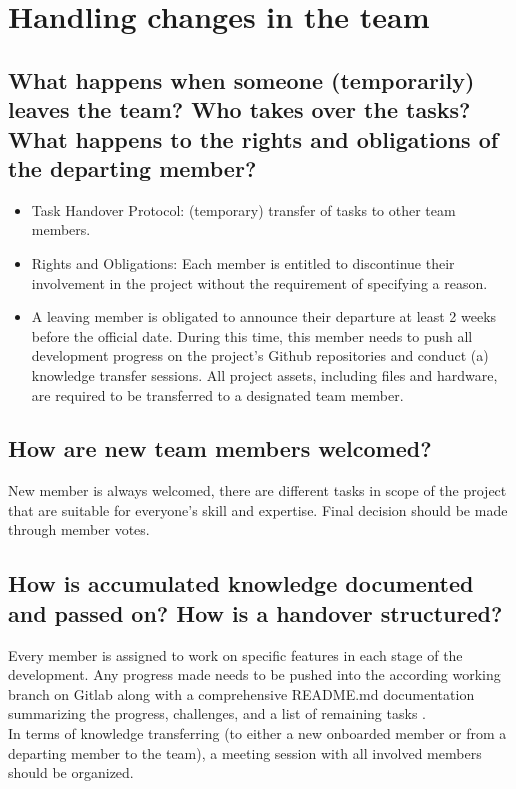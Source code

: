 \documentclass{article}
\begin{document}
\section{Handling changes in the team}
\subsection{What happens when someone (temporarily) leaves the team? Who takes over the tasks? What happens to the rights and obligations of the departing member?}
\begin{itemize}
    \item Task Handover Protocol: (temporary) transfer of tasks to other team members. 
    \item Rights and Obligations: Each member is entitled to discontinue their involvement in the project without the requirement of specifying a reason.
    \item A leaving member is obligated to announce their departure at least 2 weeks before the official date. During this time, this member needs to push all development progress on the project's Github repositories and conduct (a) knowledge transfer sessions. All project assets, including files and hardware, are required to be transferred to a designated team member.
\end{itemize}

\subsection{How are new team members welcomed?}
New member is always welcomed, there are different tasks in scope of the project that are suitable for everyone's skill and expertise.
Final decision should be made through member votes.

\subsection{How is accumulated knowledge documented and passed on? How is a handover structured?}

Every member is assigned to work on specific features in each stage of the development.
Any progress made needs to be pushed into the according working branch on Gitlab along with a comprehensive README.md documentation summarizing the progress, challenges, and a list of remaining tasks . \\

In terms of knowledge transferring (to either a new onboarded member or from a departing member to the team), a meeting session with all involved members should be organized.
\end{document}
